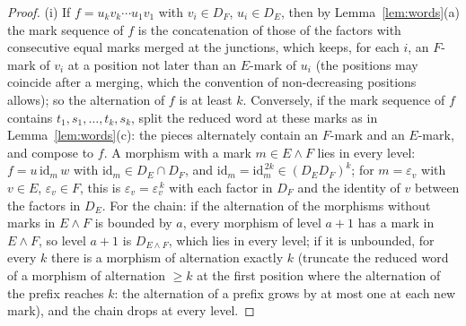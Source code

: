 \documentclass[11pt]{amsart}
\theoremstyle{definition}
\begin{document}
\begin{proof}
(i) If $f=u_kv_k\cdots u_1v_1$ with $v_i\in D_F$, $u_i\in D_E$, then by
Lemma~\ref{lem:words}(a) the mark sequence of $f$ is the concatenation
of those of the factors with consecutive equal marks merged at the
junctions, which keeps, for each $i$, an $F$-mark of $v_i$ at a position
not later than an $E$-mark of $u_i$ (the positions may coincide after a
merging, which the convention of non-decreasing positions allows); so
the alternation of $f$ is at least $k$.
Conversely, if the mark sequence of $f$ contains $t_1,s_1,\dots,t_k,s_k$,
split the reduced word at these marks as in
Lemma~\ref{lem:words}(c): the pieces alternately contain an $F$-mark and
an $E$-mark, and compose to $f$. A morphism with a mark $m\in E\wedge F$
lies in every level: $f=u\,\mathrm{id}_m\,w$ with $\mathrm{id}_m\in
D_E\cap D_F$, and $\mathrm{id}_m=\mathrm{id}_m^{\,2k}\in(D_ED_F)^k$; for
$m=\varepsilon_v$ with $v\in E$, $\varepsilon_v\in F$, this is
$\varepsilon_v=\varepsilon_v^{\,k}$ with each factor in $D_F$ and the
identity of $v$ between the factors in $D_E$. For the chain: if the
alternation of the morphisms without marks in $E\wedge F$ is bounded by
$a$, every morphism of level $a+1$ has a mark in $E\wedge F$, so level
$a+1$ is $D_{E\wedge F}$, which lies in every level; if it is unbounded,
for every $k$ there is a morphism of alternation exactly $k$ (truncate
the reduced word of a morphism of alternation $\ge k$ at the first
position where the alternation of the prefix reaches $k$: the
alternation of a prefix grows by at most one at each new mark), and the
chain drops at every level.


\end{proof}
\end{document}
